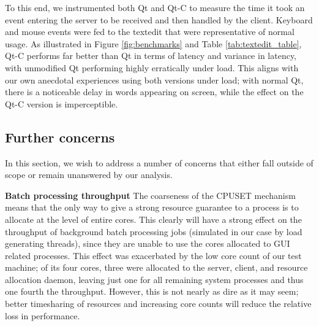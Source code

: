 \documentclass[letterpaper,twocolumn,10pt]{article}
\begin{document}
To this end, we instrumented both Qt and Qt-C to measure the time it took an event entering the server to be received and then handled by the client. Keyboard and mouse events were fed to the textedit that were representative of normal usage. As illustrated in Figure \ref{fig:benchmarks} and Table \ref{tab:textedit_table}, Qt-C performs far better than Qt in terms of latency and variance in latency, with unmodified Qt performing highly erratically under load. This aligns with our own anecdotal experiences using both versions under load; with normal Qt, there is a noticeable delay in words appearing on screen, while the effect on the Qt-C version is imperceptible.


\subsection{Further concerns}

In this section, we wish to address a number of concerns that either fall outside of scope or remain unanswered by our analysis.

\textbf{Batch processing throughput} The coarseness of the CPUSET mechanism means that the only way to give a strong resource guarantee to a process is to allocate at the level of entire cores. This clearly will have a strong effect on the throughput of background batch processing jobs (simulated in our case by load generating threads), since they are unable to use the cores allocated to GUI related processes. This effect was exacerbated by the low core count of our test machine; of its four cores, three were allocated to the server, client, and resource allocation daemon, leaving just one for all remaining system processes and thus one fourth the throughput. However, this is not nearly as dire as it may seem; better timesharing of resources and increasing core counts will reduce the relative loss in performance.

\end{document}
